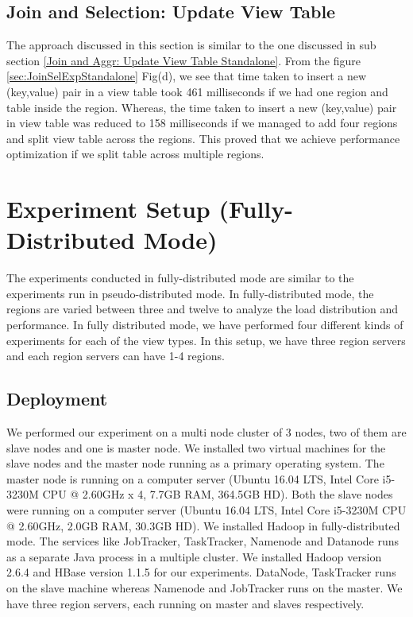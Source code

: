 \documentclass[11pt,a4paper,bibtotoc,idxtotoc,headsepline,footsepline,footexclude,BCOR12mm,DIV13]{scrbook}
\begin{document}
\subsection{Join and Selection: Update View Table} 
\label{Join and Sel: Update View Table Standalone}

The approach discussed in this section is similar to the one discussed in sub section \ref{Join and Aggr: Update View Table Standalone}. From the figure \ref{sec:JoinSelExpStandalone} Fig(d), we see that time taken to insert a new (key,value) pair in a view table took 461 milliseconds if we had one region and table inside the region. Whereas, the time taken to insert a new (key,value) pair in view table was reduced to 158 milliseconds if we managed to add four regions and split view table across the regions. This proved that we achieve performance optimization if we split table across multiple regions.


\section{Experiment Setup (Fully-Distributed Mode)}

The experiments conducted in fully-distributed mode are similar to the experiments run in pseudo-distributed mode. In fully-distributed mode, the regions are varied between three and twelve to analyze the load distribution and performance. In fully distributed mode, we have performed four different kinds of experiments for each of the view types. In this setup, we have three region servers and each region servers can have 1-4 regions.

\subsection{Deployment}
We performed our experiment on a multi node cluster of 3 nodes, two of them are slave nodes and one is master node. We installed two virtual machines for the slave nodes and the master node running as a primary operating system. The master node is running on a computer server (Ubuntu 16.04 LTS, Intel Core i5-3230M CPU @ 2.60GHz x 4, 7.7GB RAM, 364.5GB HD). Both the slave nodes were running on a computer server (Ubuntu 16.04 LTS, Intel Core i5-3230M CPU @ 2.60GHz, 2.0GB RAM, 30.3GB HD). We installed Hadoop in fully-distributed mode. The services like JobTracker, TaskTracker, Namenode and Datanode runs as a separate Java process in a multiple cluster. We installed Hadoop version 2.6.4 and HBase version 1.1.5 for our experiments. DataNode, TaskTracker runs on the slave machine whereas Namenode and JobTracker runs on the master. We have three region servers, each running on master and slaves respectively.
\end{document}
